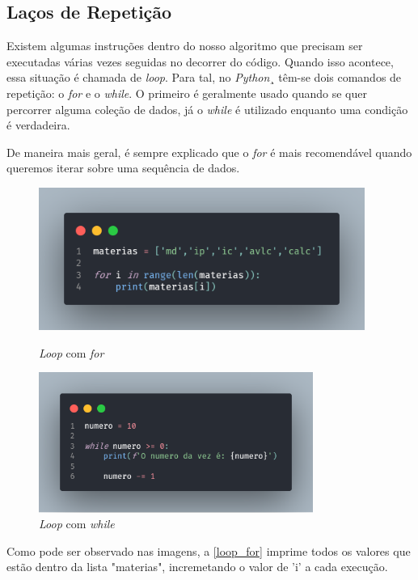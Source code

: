 \documentclass[a4paper, 12pt]{article}
\begin{document}
\subsection{Laços de Repetição}
Existem algumas instruções dentro do nosso algoritmo  que precisam ser executadas várias vezes seguidas no decorrer do código. Quando isso acontece, essa situação é chamada de \textit{loop}. Para tal, no \textit{Python}¸ têm-se dois comandos de repetição: o \textit{for} e o \textit{while}. O primeiro é geralmente usado quando se quer percorrer alguma coleção de dados, já o \textit{while} é utilizado enquanto uma condição é verdadeira. 

De maneira mais geral, é sempre explicado que o \textit{for} é mais recomendável quando queremos iterar sobre uma sequência de dados. \cite{loops} 


\begin{figure}[ht]
    \centering
    \begin{minipage}{0.5\textwidth}
        \centering
        \includegraphics[width=0.95\textwidth]{imagens/loop_for.png} 
        \caption{\textit{Loop} com \textit{for}}
        \label{loop_for}
    \end{minipage}\hfill
    \begin{minipage}{0.5\textwidth}
        \centering
        \includegraphics[width=0.8\textwidth]{imagens/loop_while.png}
        \caption{\textit{Loop} com \textit{while}}
        \label{loop_while}
    \end{minipage}
\end{figure}
Como pode ser observado nas imagens, a \ref{loop_for} imprime todos os valores que estão dentro da lista "materias", incremetando o valor de 'i' a cada execução.
\end{document}
